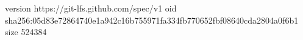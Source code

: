 version https://git-lfs.github.com/spec/v1
oid sha256:05d83e72864740e1a942c16b755971fa334fb770652fbf08640cda2804a0f6b1
size 524384
